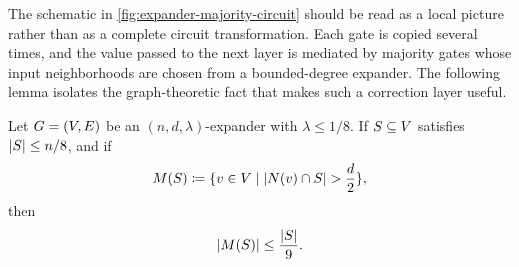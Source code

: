 The schematic in \cref{fig:expander-majority-circuit} should be read as a local picture rather than as a complete circuit transformation. Each gate is copied several times, and the value passed to the next layer is mediated by majority gates whose input neighborhoods are chosen from a bounded-degree expander. The following lemma isolates the graph-theoretic fact that makes such a correction layer useful.

\begin{lemma}
	\label{lem:majority-containment}
	Let \(G=(V,E)\) be an \((n,d,\lambda)\)-expander with \(\lambda\leq 1/8\). If \(S\subseteq V\) satisfies \(\lvert S\rvert\leq n/8\), and if
	\begin{equation}
		M(S)\coloneqq \{v\in V\mid \lvert N(v)\cap S\rvert>\frac{d}{2}\},
	\end{equation}
	then
	\begin{equation}
		\lvert M(S)\rvert\leq \frac{\lvert S\rvert}{9}.
	\end{equation}
\end{lemma}

